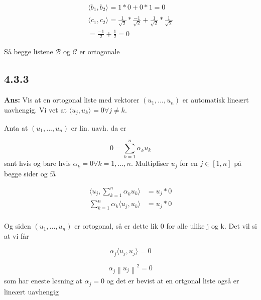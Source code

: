 \documentclass[11pt]{article}
\newenvironment{solbox}
  {\begin{mdframed}[linewidth=1pt,linecolor=black,roundcorner=5pt]
   \noindent\textbf{Ans: }\enspace}
  {\end{mdframed}}
\newcommand{\norm}[1]{\left \lVert #1 \right \rVert}
\begin{document}
\begin{align*}
    \langle b_1, b_2 \rangle_{  } = 1*0 + 0*1 = 0 \\
    \langle c_1, c_2 \rangle_{  } = \frac{ 1 }{ \sqrt{ 2 } } * \frac{ -1 }{ \sqrt{ 2 } } + \frac{ 1 }{ \sqrt{ 2 } } * \frac{ 1 }{ \sqrt{ 2 } } \\
    = \frac{ -1 }{ 2 } + \frac{ 1 }{ 2 } = 0
\end{align*}

Så begge listene $ \mathcal{B} $ og $ \mathcal{C} $ er ortogonale  



\subsection{4.3.3}

\begin{solbox}
    Vis at en ortogonal liste med vektorer $ \left( u_1,..., u_n \right)  $ er automatisk lineært uavhengig. Vi vet at $ \langle u_j, u_k \rangle_{  } =0   \forall j\neq k $. 

    Anta at $ \left( u_1, ..., u_n \right)  $ er lin. uavh. da er

    \[
        0 = \sum_{ k=1 }^{ n } \alpha_{k}^{} u_k
    \]
    sant hvis og bare hvis $ \alpha_{k}^{} =0 \forall k = 1,..., n $. Multipliser $ u_j $  for en $ j \in \left[ 1, n \right]  $ på begge sider og få


    \begin{align*}
        \langle u_j, \sum_{ k=1 }^{ n } \alpha_{k}^{} u_k \rangle_{} &= u_j * 0 \\
        \sum_{ k=1 }^{ n } \alpha_{k}^{}  \langle u_j, u_k \rangle_{  } &= u_j * 0 \\
    \end{align*}
    
    Og siden $ \left( u_1, ..., u_n \right)  $ er ortogonal, så er dette lik 0 for alle ulike j og k. Det vil si at vi får

    \[
        \alpha_{j}^{} \langle u_j, u_j \rangle_{  } = 0 
    \]

    \[
        \alpha_{j}^{} \norm{u_j}_{}^{2} =0
    \]
    som har eneste løsning at $ \alpha_{j}^{} =0 $ og det er bevist at en ortgonal liste også er lineært uavhengig
    
    
\end{solbox}
\end{document}
